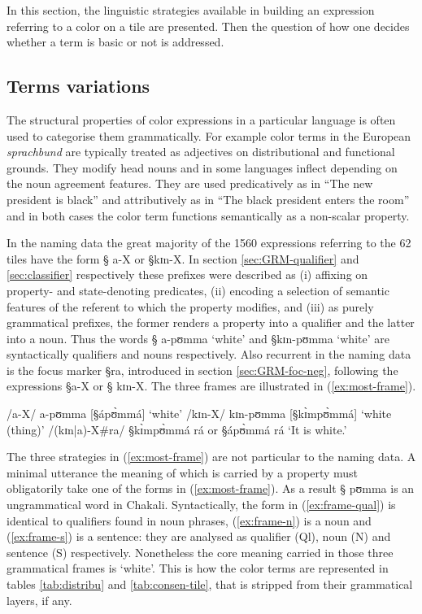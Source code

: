 In this section,  the 
linguistic strategies available in building an expression referring to a color
on a tile are presented.  Then the question of how one decides whether a term is
basic or not
is addressed.


\subsection{Terms variations}
\label{sec:termvari}

The structural properties of color expressions in a particular language is often
used to categorise them grammatically. For example color terms in the European
{\it sprachbund} are typically treated as adjectives on distributional and
functional grounds. They modify head nouns and
 in some languages inflect depending on the noun agreement features. They are
used predicatively as in ``The new president is black'' and attributively as in
``The black president enters the room'' and in both cases the color term
functions
semantically  as a non-scalar property. 


In the naming data the great
majority of the 1560 expressions referring to the 62 tiles have the form  {\S
a-X} or {\S kɪn-X}. In section \ref{sec:GRM-qualifier} and \ref{sec:classifier}
respectively  these prefixes were described as  (i)
 affixing  on property- and state-denoting predicates, (ii) encoding a selection
of
semantic features of the referent to which the property modifies,  and (iii)  
 as  purely grammatical prefixes, the former renders a property into a
qualifier and the latter into a noun. Thus the words {\S
a-pʊmma} `white'  and  {\S kɪn-pʊmma} `white'  are syntactically qualifiers and
nouns
respectively. 
 Also
recurrent in the naming data is the focus marker {\S ra}, introduced in section
\ref{sec:GRM-foc-neg}, following the expressions {\S a-X} or {\S
kɪn-X}. The three frames are illustrated in (\ref{ex:most-frame}).

\begin{exe}
\ex\label{ex:most-frame}
\begin{xlist}
  \ex\label{ex:frame-qual} /a-X/  a-pʊmma [{\S ápʊ̀mmá}]  `white' 
 \ex\label{ex:frame-n}  /kɪn-X/ kɪn-pʊmma [{\S kɪ̀mpʊ̀mmá}]  `white (thing)'
 \ex\label{ex:frame-s}  /(kɪn|a)-X\#ra/  {\S kɪ̀mpʊ̀mmá rá} or {\S ápʊ̀mmá rá}
`It is white.'

\end{xlist}
\end{exe}


The three strategies in (\ref{ex:most-frame}) are not particular to the naming
data. A minimal utterance the meaning of which is carried by a property  must
obligatorily take one of the forms in (\ref{ex:most-frame}). As a result {\S
pʊmma} is an ungrammatical word in Chakali. Syntactically, the form in
(\ref{ex:frame-qual}) is identical to qualifiers found in noun phrases, 
(\ref{ex:frame-n}) is a noun and  (\ref{ex:frame-s}) is a sentence: they are
analysed as qualifier (Ql), noun (N) and sentence (S) respectively. Nonetheless
the core meaning carried in those three grammatical frames is `white'.
This is
how the color terms are represented in tables \ref{tab:distribu} and
\ref{tab:consen-tile}, that is stripped from their grammatical layers, if any. 

